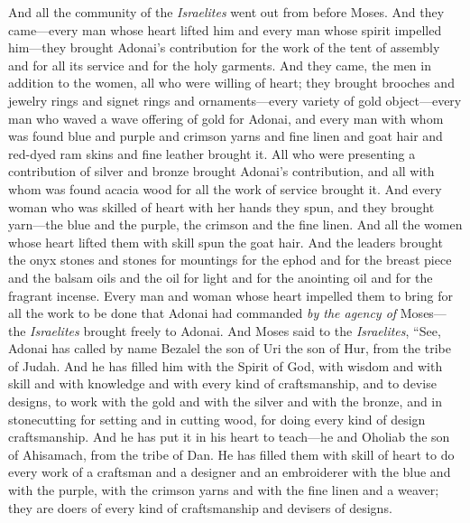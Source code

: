 \begin{biblechapter}
\verse And all the community of the \textit{Israelites} went out from before Moses.
\verse And they came—every man whose heart lifted him and every man whose spirit impelled him—they brought Adonai’s contribution for the work of the tent of assembly and for all its service and for the holy garments.
\verse And they came, the men in addition to the women, all who were willing of heart; they brought brooches and jewelry rings and signet rings and ornaments—every variety of gold object—every man who waved a wave offering of gold for Adonai,
\verse and every man with whom was found blue and purple and crimson yarns and fine linen and goat hair and red-dyed ram skins and fine leather brought it.
\verse All who were presenting a contribution of silver and bronze brought Adonai’s contribution, and all with whom was found acacia wood for all the work of service brought it.
\verse And every woman who was skilled of heart with her hands they spun, and they brought yarn—the blue and the purple, the crimson and the fine linen.
\verse And all the women whose heart lifted them with skill spun the goat hair.
\verse And the leaders brought the onyx stones and stones for mountings for the ephod and for the breast piece
\verse and the balsam oils and the oil for light and for the anointing oil and for the fragrant incense.
\verse Every man and woman whose heart impelled them to bring for all the work to be done that Adonai had commanded \textit{by the agency of} Moses—the \textit{Israelites} brought freely to Adonai.
\verse And Moses said to the \textit{Israelites}, “See, Adonai has called by name Bezalel the son of Uri the son of Hur, from the tribe of Judah.
\verse And he has filled him with the Spirit of God, with wisdom and with skill and with knowledge and with every kind of craftsmanship,
\verse and to devise designs, to work with the gold and with the silver and with the bronze,
\verse and in stonecutting for setting and in cutting wood, for doing every kind of design craftsmanship.
\verse And he has put it in his heart to teach—he and Oholiab the son of Ahisamach, from the tribe of Dan.
\verse He has filled them with skill of heart to do every work of a craftsman and a designer and an embroiderer with the blue and with the purple, with the crimson yarns and with the fine linen and a weaver; they are doers of every kind of craftsmanship and devisers of designs.
\end{biblechapter}


